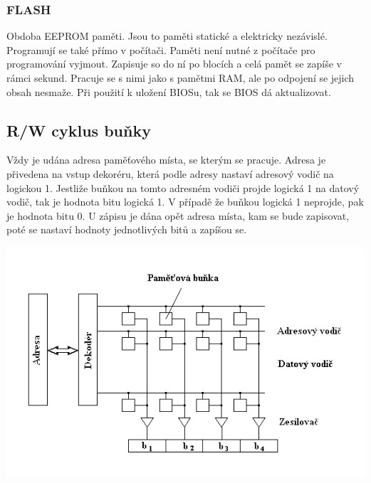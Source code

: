 \subsubsection{FLASH}
Obdoba EEPROM paměti.
Jsou to paměti statické a elektricky nezávislé.
Programují se také přímo v počítači.
Paměti není nutné z počítače pro programování vyjmout.
Zapisuje so do ní po blocích a celá pamět se zapíše v rámci sekund.
Pracuje se s nimi jako s pamětmi RAM, ale po odpojení se jejich obsah nesmaže.
Při použití k uložení BIOSu, tak se BIOS dá aktualizovat.
\subsection{R/W cyklus buňky}
\begin{multicols}{2}
    Vždy je udána adresa paměťového místa, se kterým se pracuje.
    Adresa je přivedena na vstup dekoréru, která podle adresy nastaví adresový vodič na logickou 1.
    Jestliže buňkou na tomto adresném vodiči projde logická 1 na datový vodič, tak je hodnota bitu logická 1.
    V případě že buňkou logická 1 neprojde, pak je hodnota bitu 0.
    U zápisu je dána opět adresa místa, kam se bude zapisovat, poté se nastaví hodnoty jednotlivých bitů a zapíšou se.\\
    \columnbreak

    \includegraphics[width=0.9\linewidth]{TVY-POS/Polovodicove-pameti/memorystructure.png}
\end{multicols}
